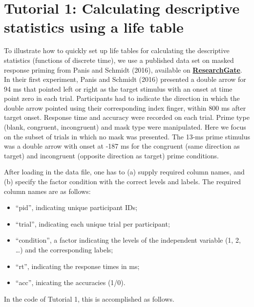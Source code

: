 \documentclass[
  man,floatsintext]{apa6}
\providecommand{\tightlist}{%
  \setlength{\itemsep}{0pt}\setlength{\parskip}{0pt}}
\begin{document}
\section{Tutorial 1: Calculating descriptive statistics using a life table}\label{tutorial-1-calculating-descriptive-statistics-using-a-life-table}

To illustrate how to quickly set up life tables for calculating the descriptive statistics (functions of discrete time), we use a published data set on masked response priming from Panis and Schmidt (2016), available on \href{https://www.researchgate.net/publication/304069212_What_Is_Shaping_RT_and_Accuracy_Distributions_Active_and_Selective_Response_Inhibition_Causes_the_Negative_Compatibility_Effect}{\textbf{ResearchGate}}.
In their first experiment, Panis and Schmidt (2016) presented a double arrow for 94 ms that pointed left or right as the target stimulus with an onset at time point zero in each trial. Participants had to indicate the direction in which the double arrow pointed using their corresponding index finger, within 800 ms after target onset. Response time and accuracy were recorded on each trial. Prime type (blank, congruent, incongruent) and mask type were manipulated. Here we focus on the subset of trials in which no mask was presented. The 13-ms prime stimulus was a double arrow with onset at -187 ms for the congruent (same direction as target) and incongruent (opposite direction as target) prime conditions.

After loading in the data file, one has to (a) supply required column names, and (b) specify the factor condition with the correct levels and labels.
The required column names are as follows:

\begin{itemize}
\tightlist
\item
  ``pid'', indicating unique participant IDs;
\item
  ``trial'', indicating each unique trial per participant;
\item
  ``condition'', a factor indicating the levels of the independent variable (1, 2, \ldots) and the corresponding labels;
\item
  ``rt'', indicating the response times in ms;
\item
  ``acc'', inicating the accuracies (1/0).
\end{itemize}

In the code of Tutorial 1, this is accomplished as follows.

\scriptsize
\end{document}
